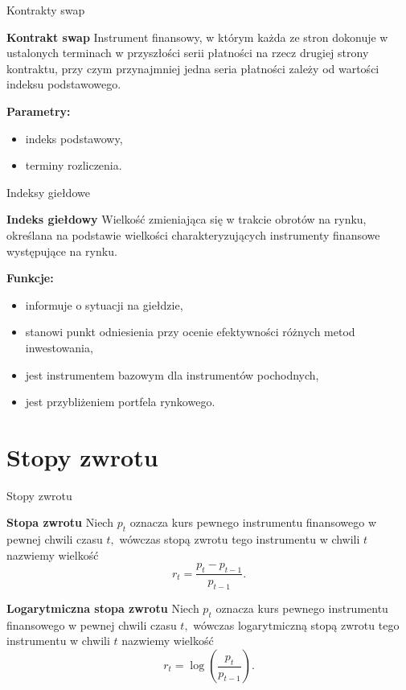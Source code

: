 \documentclass[a4paper, 11pt]{beamer}
\begin{document}
	\begin{frame}{Kontrakty swap}
		\begin{block}{\textbf{Kontrakt swap}}
			Instrument finansowy, w którym każda ze stron dokonuje w ustalonych terminach w przyszłości
			serii płatności na rzecz drugiej strony kontraktu, przy czym przynajmniej jedna seria płatności
			zależy od wartości indeksu podstawowego.
		\end{block}
		\textbf{Parametry:}
		\begin{itemize}
			\item indeks podstawowy,
			\item terminy rozliczenia.
		\end{itemize}
	\end{frame}
	
	\begin{frame}{Indeksy giełdowe}
		\begin{block}{\textbf{Indeks giełdowy}}
			Wielkość zmieniająca się w trakcie obrotów na rynku, określana na podstawie wielkości
			charakteryzujących instrumenty finansowe występujące na rynku.
		\end{block}
		\textbf{Funkcje:}
		\begin{itemize}
			\item informuje o sytuacji na giełdzie,
			\item stanowi punkt odniesienia przy ocenie efektywności różnych metod inwestowania,
			\item jest instrumentem bazowym dla instrumentów pochodnych,
			\item jest przybliżeniem portfela rynkowego.
		\end{itemize}
	\end{frame}
	
	\section{Stopy zwrotu}
	
	\begin{frame}{Stopy zwrotu}
		\begin{block}{\textbf{Stopa zwrotu}}
			Niech $p_t$ oznacza kurs pewnego instrumentu finansowego w pewnej chwili
			czasu $t,$ wówczas stopą zwrotu tego instrumentu w chwili $t$ nazwiemy
			wielkość \[
				r_t = \frac{p_t - p _{t-1}}{p_{t-1}}.
			\]
		\end{block}
		\begin{block}{\textbf{Logarytmiczna stopa zwrotu}}
			Niech $p_t$ oznacza kurs pewnego instrumentu finansowego w pewnej chwili
			czasu $t,$ wówczas logarytmiczną stopą zwrotu tego instrumentu w chwili
			$t$ nazwiemy wielkość \[
				r_t = \log\left(\frac{p_t}{p_{t-1}}\right).
			\]
		\end{block}
	\end{frame}
	
\end{document}
